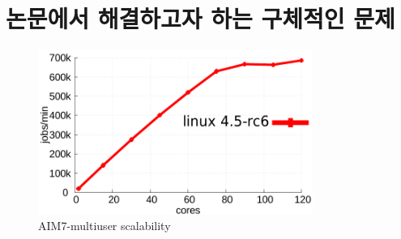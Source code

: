 \section{논문에서 해결하고자 하는 구체적인 문제}\label{sec:bg}




\begin{figure}[h]
    \centering
    \includegraphics[width=0.8\textwidth]{graph/aim7_default}
    \caption{AIM7-multiuser scalability}
  \label{fig:aim7_default}
\end{figure}

